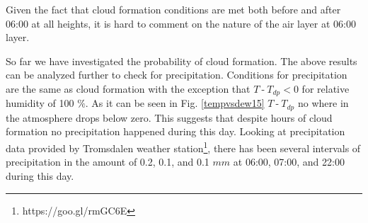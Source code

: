 \documentclass[a4paper,12pt]{article}
\numberwithin{equation}{section} %
\begin{document}
Given the fact that cloud formation conditions are met both before and after 06:00 at all heights, it is hard to comment on the nature of the air layer at 06:00 layer.

So far we have investigated the probability of cloud formation. The above results can be analyzed further to check for precipitation. Conditions for precipitation are the same as cloud formation with the exception that $T\:$-$\:T_{dp} < 0$ for relative humidity of 100 $\%$. As it can be seen in Fig. \ref{tempvsdew15} $T\:$-$\:T_{dp}$ no where in the atmosphere drops below zero. This suggests that despite hours of cloud formation no precipitation happened during this day. Looking at precipitation data provided by Tromsdalen weather station\footnote{https://goo.gl/rmGC6E}, there has been several intervals of precipitation in the amount of 0.2, 0.1, and 0.1 $mm$ at 06:00, 07:00, and 22:00 during this day.

 
\end{document}
